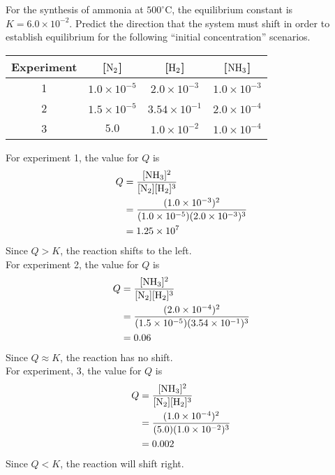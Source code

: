 \begin{sample}{For the synthesis of ammonia at $500^{\circ}$C, the equilibrium constant is $K=6.0\times10^{-2}$.
    Predict the direction that the system must shift in order to establish equilibrium for the
    following ``initial concentration'' scenarios.
    \begin{table}[!ht]
        \footnotesize
        \centering
        \setlength{\tabcolsep}{12pt}      %
        \renewcommand{\arraystretch}{1.2} %
        \begin{tabular}{|c|c|c|c|}
            \hline
            Experiment & [$\ch{N2}$] & [$\ch{H2}$] & [$\ch{NH3}$] \\ \hline
            1 & $1.0\times10^{-5}$ & $2.0\times10^{-3}$ & $1.0\times10^{-3}$ \\ \hline
            2 & $1.5\times10^{-5}$ & $3.54\times10^{-1}$ & $2.0\times10^{-4}$ \\ \hline
            3 & $5.0$ & $1.0\times10^{-2}$ & $1.0\times10^{-4}$ \\ \hline
        \end{tabular}
    \end{table}
}
    For experiment 1, the value for $Q$ is
    \begin{align*}
        Q&=\frac{[\ch{NH3}]^2}{[\ch{N2}][\ch{H2}]^3}\\
         &=\frac{(1.0\times10^{-3})^2}{(1.0\times10^{-5})(2.0\times10^{-3})^3}\\
         &=1.25\times10^{7}
    \end{align*}
    Since $Q>K$, the reaction shifts to the left.\\
    For experiment 2, the value for $Q$ is
    \begin{align*}
        Q&=\frac{[\ch{NH3}]^2}{[\ch{N2}][\ch{H2}]^3}\\
         &=\frac{(2.0\times10^{-4})^2}{(1.5\times10^{-5})(3.54\times10^{-1})^3}\\
         &=0.06
    \end{align*}
    Since $Q\approx K$, the reaction has no shift.\\
    For experiment, 3, the value for $Q$ is
    \begin{align*}
        Q&=\frac{[\ch{NH3}]^2}{[\ch{N2}][\ch{H2}]^3}\\
         &=\frac{(1.0\times10^{-4})^2}{(5.0)(1.0\times10^{-2})^3}\\
         &=0.002
    \end{align*}
    Since $Q<K$, the reaction will shift right.
\end{sample}
